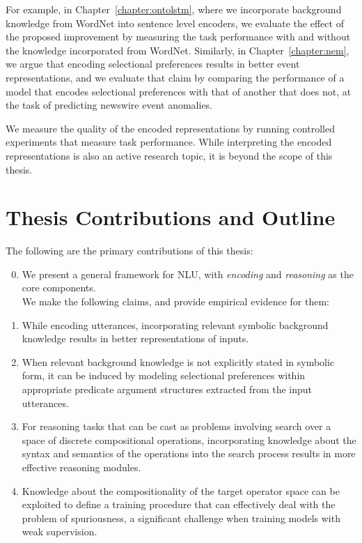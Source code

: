 For example, in Chapter~\ref{chapter:ontolstm}, where we incorporate background knowledge from
WordNet into sentence level encoders, we evaluate the effect of the proposed improvement by
measuring the task performance with and without the knowledge incorporated from WordNet. Similarly,
in Chapter~\ref{chapter:nem}, we argue that encoding selectional preferences results in better event
representations, and we evaluate that claim by comparing the performance of a model that encodes
selectional preferences with that of another that does not, at the task of predicting
newswire event anomalies.

We measure the quality of the encoded representations by running controlled experiments that measure
task performance. While interpreting the encoded representations is also an active research
topic, it is beyond the scope of this thesis.

\section{Thesis Contributions and Outline}
The following are the primary contributions of this thesis:
\begin{enumerate}
	\setcounter{enumi}{-1}
	\item We present a general framework for NLU, with \textit{encoding} and \textit{reasoning }
		as the core components.\\
	We make the following claims, and provide empirical evidence for them:
	\item While encoding utterances, incorporating relevant symbolic background knowledge results
		in better representations of inputs.
	\item When relevant background knowledge is not explicitly stated in symbolic form,
		it can be induced by modeling selectional preferences within appropriate predicate argument
		structures extracted from the input utterances.
	\item For reasoning tasks that can be cast as problems involving search over a space of
		discrete compositional operations, incorporating knowledge about the syntax and semantics
		of the operations into the search process results in more effective reasoning modules.
	\item Knowledge about the compositionality of the target operator space
		can be exploited to define a training procedure that can effectively deal with the
		problem of spuriousness, a significant challenge when training models with weak
		supervision.
\end{enumerate}

